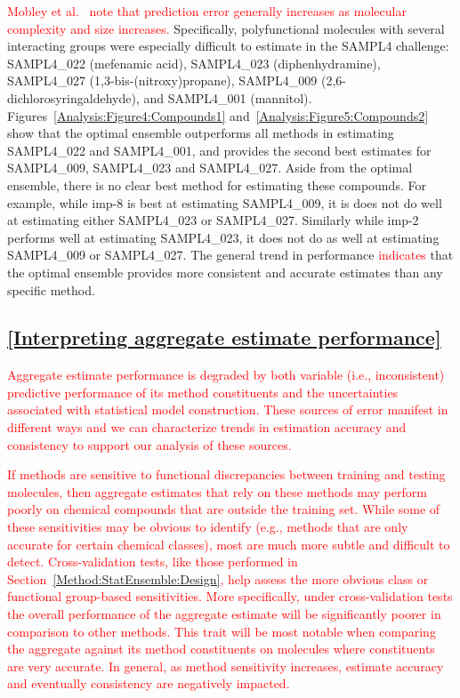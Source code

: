 \documentclass[journal=jpcbfk, manuscript=article]{achemso}
\newcommand{\+}[1]{\ensuremath{\mathbf{#1}}}
\newcommand{\rev}[1]{\textsf{\textcolor{red}{#1}}}
\begin{document}
\rev{Mobley et al.~\cite{Mobley:2014} note that prediction error generally increases as molecular complexity and size increases.} 
Specifically, polyfunctional molecules with several interacting groups were especially difficult to estimate in the SAMPL4 challenge: SAMPL4\_022 (mefenamic acid), SAMPL4\_023 (diphenhydramine), SAMPL4\_027 (1,3-bis-(nitroxy)propane), SAMPL4\_009 (2,6-dichlorosyringaldehyde), and SAMPL4\_001 (mannitol). 
Figures~\ref{Analysis:Figure4:Compounds1} and~\ref{Analysis:Figure5:Compounds2} show that the optimal ensemble outperforms all methods in estimating SAMPL4\_022 and SAMPL4\_001, and provides the second best estimates for SAMPL4\_009, SAMPL4\_023 and SAMPL4\_027.
Aside from the optimal ensemble, there is no clear best method for estimating these compounds.
For example, while imp-8 is best at estimating SAMPL4\_009, it is does not do well at estimating either SAMPL4\_023 or SAMPL4\_027.
Similarly while imp-2 performs well at estimating SAMPL4\_023, it does not do as well at estimating SAMPL4\_009 or SAMPL4\_027.
The general trend in performance \rev{indicates} that the optimal ensemble provides more consistent and accurate estimates than any specific method. 

\subsection{\ref{Interpreting aggregate estimate performance}}
\rev{Aggregate estimate performance is degraded by both variable (i.e., inconsistent) predictive performance of its method constituents and the uncertainties associated with statistical model construction.
These sources of error manifest in different ways and we can characterize trends in estimation accuracy and consistency to support our analysis of these sources.}

\rev{If methods are sensitive to functional discrepancies between training and testing molecules, then aggregate estimates that rely on these methods may perform poorly on chemical  compounds that are outside the training set. 
While some of these sensitivities may be obvious to identify (e.g., methods that are only accurate for certain chemical classes), most are much more subtle and difficult to detect. 
Cross-validation tests, like those performed in Section~\ref{Method:StatEnsemble:Design}, help assess the more obvious class or functional group-based sensitivities.
More specifically, under cross-validation tests the overall performance of the aggregate estimate will be significantly poorer in comparison to other methods. 
This trait will be most notable when comparing the aggregate against its method constituents on molecules where constituents are very accurate.
In general, as method sensitivity increases, estimate accuracy and eventually consistency are negatively impacted.}
\end{document}
